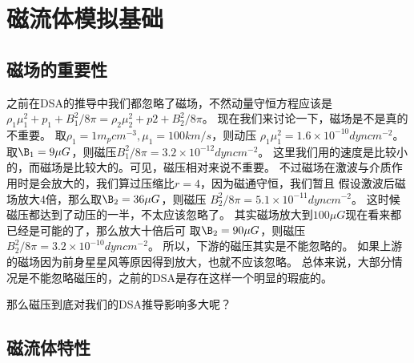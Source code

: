 \section{磁流体模拟基础}
\label{TheoryMHD}

\subsection{磁场的重要性}
之前在DSA的推导中我们都忽略了磁场，不然动量守恒方程应该是
$\rho_1\mu_1^2+p_1+B_1^2/8\pi=\rho_2\mu_2^2+p2+B_2^2/8\pi$。
现在我们来讨论一下，磁场是不是真的不重要。
取$\rho_1=1 m_p cm^{-3}, \mu_1 = 100 km/s$，则动压
$\rho_1\mu_1^2=1.6 \times 10^{-10} dyn cm^{-2}$。
取$\B_1=9\mu G$，则磁压$B_1^2/8\pi=3.2 \times 10^{-12} dyn cm^{-2}$。
这里我们用的速度是比较小的，而磁场是比较大的。可见，磁压相对来说不重要。
不过磁场在激波与介质作用时是会放大的，我们算过压缩比$r=4$，因为磁通守恒，我们暂且
假设激波后磁场放大4倍，那么取$\B_2=36\mu G$，则磁压
$B_2^2/8\pi=5.1 \times 10^{-11} dyn cm^{-2}$。
这时候磁压都达到了动压的一半，不太应该忽略了。
其实磁场放大到$100\mu G$现在看来都已经是可能的了\citep{Ji2016b}，那么放大十倍后可
取$\B_2=90\mu G$，则磁压$B_2^2/8\pi=3.2 \times 10^{-10} dyn cm^{-2}$。
所以，下游的磁压其实是不能忽略的。
如果上游的磁场因为前身星星风等原因得到放大，也就不应该忽略。
总体来说，大部分情况是不能忽略磁压的，之前的DSA是存在这样一个明显的瑕疵的。

那么磁压到底对我们的DSA推导影响多大呢？


\subsection{磁流体特性}
